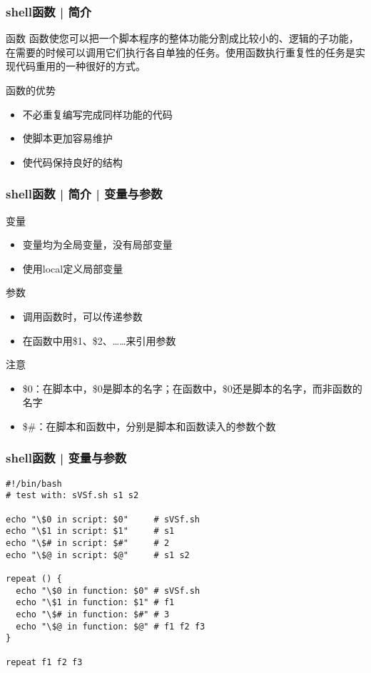 \begin{frame}
  \frametitle{shell函数 | 简介}
  \begin{block}{函数}
    函数使您可以把一个脚本程序的整体功能分割成比较小的、逻辑的子功能，在需要的时候可以调用它们执行各自单独的任务。使用函数执行重复性的任务是实现代码重用的一种很好的方式。
  \end{block}
  \pause
  \begin{block}{函数的优势}
    \begin{itemize}
      \item 不必重复编写完成同样功能的代码
      \item 使脚本更加容易维护
      \item 使代码保持良好的结构
    \end{itemize}
  \end{block}
\end{frame}

\begin{frame}
  \frametitle{shell函数 | 简介 | \alert{变量与参数}}
  \begin{block}{变量}
    \begin{itemize}
      \item 变量均为全局变量，没有局部变量
      \item 使用local定义局部变量
    \end{itemize}
  \end{block}
  \pause
  \begin{block}{参数}
    \begin{itemize}
      \item 调用函数时，可以传递参数
      \item 在函数中用\$1、\$2、……来引用参数
    \end{itemize}
  \end{block}
  \pause
  \begin{block}{注意}
    \begin{itemize}
      \item \$0：在脚本中，\$0是脚本的名字；在函数中，\$0还是脚本的名字，而非函数的名字
      \item \$\#：在脚本和函数中，分别是脚本和函数读入的参数个数
    \end{itemize}
  \end{block}
\end{frame}

\begin{frame}[fragile]
  \frametitle{shell函数 | \alert{变量与参数}}
  \vspace{-0.5em}
\begin{lstlisting}
#!/bin/bash
# test with: sVSf.sh s1 s2

echo "\$0 in script: $0"     # sVSf.sh
echo "\$1 in script: $1"     # s1
echo "\$# in script: $#"     # 2
echo "\$@ in script: $@"     # s1 s2

repeat () {
  echo "\$0 in function: $0" # sVSf.sh
  echo "\$1 in function: $1" # f1
  echo "\$# in function: $#" # 3
  echo "\$@ in function: $@" # f1 f2 f3
}

repeat f1 f2 f3
\end{lstlisting}
\end{frame}

